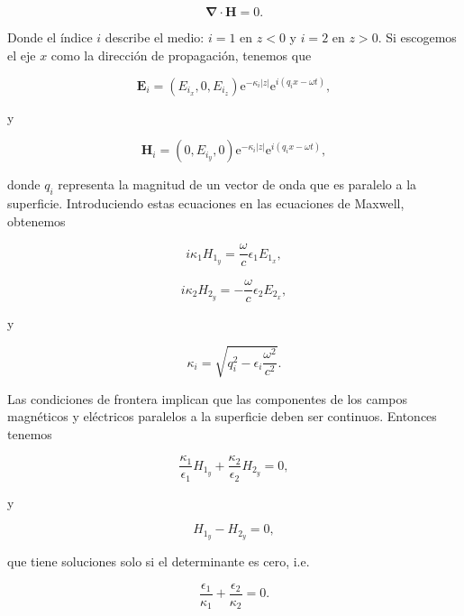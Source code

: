 \documentclass[a4paper,11pt]{article}
\numberwithin{equation}{section}
\newcommand{\euler}{\mathrm{e}}
\begin{document}
\begin{equation}
 \pmb{\nabla} \cdot \mathbf{H} = 0.
\end{equation}

Donde el índice $i$ describe el medio: $i = 1$ en $z < 0$ y $i = 2$ en $z > 0$. Si 
escogemos el eje $x$ como la dirección de propagación, tenemos que 

\begin{equation}
 \mathbf{E}_i = (E_{i_x},0,E_{i_z}) \euler^{-\kappa_i|z|} \euler^{i(q_i x - \omega t)},
\end{equation}

y 

\begin{equation}
 \mathbf{H}_i = (0,E_{i_y},0) \euler^{-\kappa_i|z|} \euler^{i(q_i x - \omega t)},
\end{equation}

donde $q_i$ representa la magnitud de un vector de onda que es paralelo a la 
superficie. Introduciendo estas ecuaciones en las ecuaciones de Maxwell, obtenemos 

\begin{equation}
 i \kappa_1 H_{1_y} = \frac{\omega}{c} \epsilon_1 E_{1_x}, 
\end{equation}

\begin{equation}
 i \kappa_2 H_{2_y} = - \frac{\omega}{c} \epsilon_2 E_{2_x},
\end{equation}

y 

\begin{equation}
 \kappa_i = \sqrt{q_i^2 - \epsilon_i \frac{\omega^2}{c^2}}.
\end{equation}

Las condiciones de frontera implican que las componentes de los campos magnéticos 
y eléctricos paralelos a la superficie deben ser continuos. Entonces tenemos 

\begin{equation}
 \frac{\kappa_1}{\epsilon_1} H_{1_y} + \frac{\kappa_2}{\epsilon_2} H_{2_y} = 0,
\end{equation}

y 

\begin{equation}
 H_{1_y} - H_{2_y} = 0,
\end{equation}

que tiene soluciones solo si el determinante es cero, i.e. 

\begin{equation}
 \frac{\epsilon_1}{\kappa_1} + \frac{\epsilon_2}{\kappa_2} = 0.
\end{equation}
\end{document}
